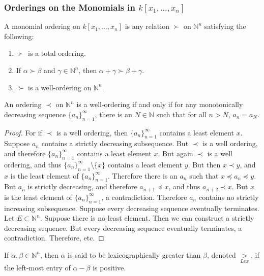 \documentclass[../main.tex]{subfiles}
\begin{document}
\subsubsection{Orderings on the Monomials in \texorpdfstring{$k[x_1,\hdots ,x_n]$}{kx}}
%
\begin{definition}
A monomial ordering on $k[x_1,\hdots, x_n]$ is any relation $\succ$ on $\mathbb{N}^n$ satisfying the following:
\begin{enumerate}
\item $\succ$ is a total ordering.
\item If $\alpha \succ \beta$ and $\gamma \in \mathbb{N}^n$, then $\alpha+\gamma \succ \beta + \gamma$.
\item $\succ$ is a well-ordering on $\mathbb{N}^n$. 
\end{enumerate}
\end{definition}
%
\begin{theorem}
An ordering $\prec$ on $\mathbb{N}^n$ is a well-ordering if and only if for any monotonically decreasing sequence $\{a_n\}_{n=1}^{\infty}$, there is an $N\in \mathbb{N}$ such that for all $n>N$, $a_n = a_N$.
\end{theorem}
\begin{proof}
For if $\prec$ is a well ordering, then $\{a_n\}_{n=1}^{\infty}$ contains a least element $x$. Suppose $a_n$ contains a strictly decreasing subsequence. But $\prec$ is a well ordering, and therefore $\{a_n\}_{n=1}^{\infty}$ contains a least element $x$. But again $\prec$ is a well ordering, and thus $\{a_n\}_{n=1}^{\infty} \setminus \{x\}$ contains a least element $y$. But then $x\prec y$, and $x$ is the least element of $\{a_n\}_{n=1}^{\infty}$. Therefore there is an $a_n$ such that $x\preceq a_n \preceq y$. But $a_n$ is strictly decreasing, and therefore $a_{n+1} \preceq x$, and thus $a_{n+2} \prec x$. But $x$ is the least element of $\{a_n\}_{n=1}^{\infty}$, a contradiction. Therefore $a_n$ contains no strictly increasing subsequence. Suppose every decreasing sequence eventually terminates. Let $E\subset \mathbb{N}^n$. Suppose there is no least element. Then we can construct a strictly decreasing sequence. But every decreasing sequence eventually terminates, a contradiction. Therefore, etc.
\end{proof}
%
\begin{definition}
If $\alpha,\beta \in \mathbb{N}^n$, then $\alpha$ is said to be lexicographically greater than $\beta$, denoted $\underset{Lex}{>}$, if the left-most entry of $\alpha-\beta$ is positive.
\end{definition}
\end{document}
